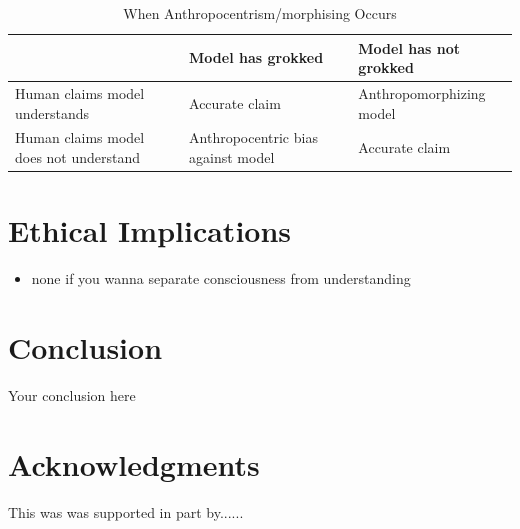 \documentclass{article}
\begin{document}
\begin{table}[h]
 \caption{When Anthropocentrism/morphising Occurs}
  \centering
  \begin{tabular}{l|ll}
     & Model has grokked & Model has not grokked \\
    \midrule
    Human claims model understands & Accurate claim & Anthropomorphizing model \\
    Human claims model does not understand & Anthropocentric bias against model & Accurate claim \\
  \end{tabular}
  \label{tab:2x2table}
\end{table}


\section{Ethical Implications}
\label{sec:ethics}

\begin{itemize}
    \item none if you wanna separate consciousness from understanding
\end{itemize}

\section{Conclusion}
\label{sec:conclusion}
Your conclusion here

\section*{Acknowledgments}
This was was supported in part by......

\nocite{}
  
  
\end{document}
